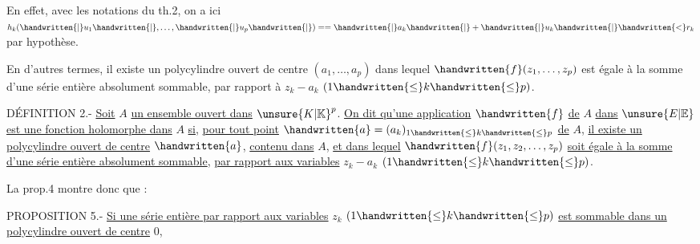 En effet, avec les notations du th.2, on a ici $h_k(\handwritten{|}u_1\handwritten{|},\ldots,\handwritten{|}u_p\handwritten{|})==\handwritten{|}a_k\handwritten{|}+\handwritten{|}u_k\handwritten{|}\handwritten{<}r_k$ par hypothèse.

En d'autres termes, il existe un polycylindre ouvert de centre $(a_1,\ldots,a_p)$ dans lequel $\handwritten{f}(z_1,\ldots,z_p)$ est égale à la somme d'une série entière absolument sommable, par rapport à $z_k-a_k$ $(1\handwritten{\leq}k\handwritten{\leq}p)$.

DÉFINITION 2.- \uline{Soit} $A$ \uline{un ensemble ouvert dans} ${\unsure{K|\mathbb{K}}}^{p}$. \uline{On dit qu'une application} $\handwritten{f}$ \uline{de} $A$ \uline{dans} $\unsure{E|\mathbb{E}}$ \uline{est une fonction holomorphe dans} $A$ \uline{si}, \uline{pour tout point} $\handwritten{a}=(a_k)_{1\handwritten{\leq}k\handwritten{\leq}p}$ \uline{de} $A$, \uline{il existe un polycylindre ouvert de centre} $\handwritten{a}$, \uline{contenu dans} $A$, \uline{et dans lequel} $\handwritten{f}(z_1,z_2,\ldots,z_p)$ \uline{soit égale à la somme d'une série entière absolument sommable}, \uline{par rapport aux variables} $z_k-a_k$ $(1\handwritten{\leq}k\handwritten{\leq}p)$.

La prop.4 montre donc que :

PROPOSITION 5.- \uline{Si une série entière par rapport aux variables} $z_k$ $(1\handwritten{\leq}k\handwritten{\leq}p)$ \uline{est sommable dans un polycylindre ouvert de centre} $0$,
